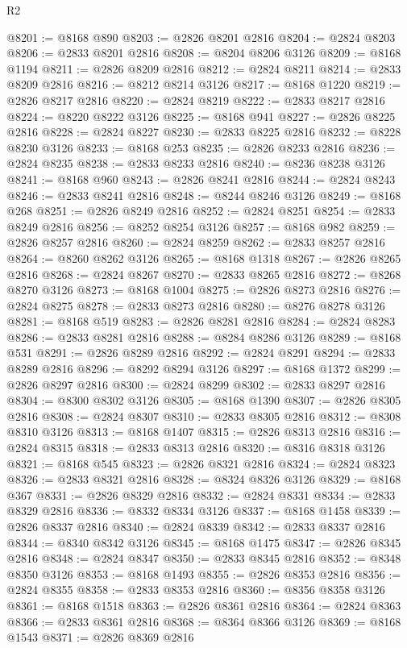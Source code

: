 \begin{lexlean}{R2}
\begin{coremodule}
@8201 := @8168 @890
@8203 := @2826 @8201 @2816
@8204 := @2824 @8203
@8206 := @2833 @8201 @2816
@8208 := @8204 @8206 @3126
@8209 := @8168 @1194
@8211 := @2826 @8209 @2816
@8212 := @2824 @8211
@8214 := @2833 @8209 @2816
@8216 := @8212 @8214 @3126
@8217 := @8168 @1220
@8219 := @2826 @8217 @2816
@8220 := @2824 @8219
@8222 := @2833 @8217 @2816
@8224 := @8220 @8222 @3126
@8225 := @8168 @941
@8227 := @2826 @8225 @2816
@8228 := @2824 @8227
@8230 := @2833 @8225 @2816
@8232 := @8228 @8230 @3126
@8233 := @8168 @253
@8235 := @2826 @8233 @2816
@8236 := @2824 @8235
@8238 := @2833 @8233 @2816
@8240 := @8236 @8238 @3126
@8241 := @8168 @960
@8243 := @2826 @8241 @2816
@8244 := @2824 @8243
@8246 := @2833 @8241 @2816
@8248 := @8244 @8246 @3126
@8249 := @8168 @268
@8251 := @2826 @8249 @2816
@8252 := @2824 @8251
@8254 := @2833 @8249 @2816
@8256 := @8252 @8254 @3126
@8257 := @8168 @982
@8259 := @2826 @8257 @2816
@8260 := @2824 @8259
@8262 := @2833 @8257 @2816
@8264 := @8260 @8262 @3126
@8265 := @8168 @1318
@8267 := @2826 @8265 @2816
@8268 := @2824 @8267
@8270 := @2833 @8265 @2816
@8272 := @8268 @8270 @3126
@8273 := @8168 @1004
@8275 := @2826 @8273 @2816
@8276 := @2824 @8275
@8278 := @2833 @8273 @2816
@8280 := @8276 @8278 @3126
@8281 := @8168 @519
@8283 := @2826 @8281 @2816
@8284 := @2824 @8283
@8286 := @2833 @8281 @2816
@8288 := @8284 @8286 @3126
@8289 := @8168 @531
@8291 := @2826 @8289 @2816
@8292 := @2824 @8291
@8294 := @2833 @8289 @2816
@8296 := @8292 @8294 @3126
@8297 := @8168 @1372
@8299 := @2826 @8297 @2816
@8300 := @2824 @8299
@8302 := @2833 @8297 @2816
@8304 := @8300 @8302 @3126
@8305 := @8168 @1390
@8307 := @2826 @8305 @2816
@8308 := @2824 @8307
@8310 := @2833 @8305 @2816
@8312 := @8308 @8310 @3126
@8313 := @8168 @1407
@8315 := @2826 @8313 @2816
@8316 := @2824 @8315
@8318 := @2833 @8313 @2816
@8320 := @8316 @8318 @3126
@8321 := @8168 @545
@8323 := @2826 @8321 @2816
@8324 := @2824 @8323
@8326 := @2833 @8321 @2816
@8328 := @8324 @8326 @3126
@8329 := @8168 @367
@8331 := @2826 @8329 @2816
@8332 := @2824 @8331
@8334 := @2833 @8329 @2816
@8336 := @8332 @8334 @3126
@8337 := @8168 @1458
@8339 := @2826 @8337 @2816
@8340 := @2824 @8339
@8342 := @2833 @8337 @2816
@8344 := @8340 @8342 @3126
@8345 := @8168 @1475
@8347 := @2826 @8345 @2816
@8348 := @2824 @8347
@8350 := @2833 @8345 @2816
@8352 := @8348 @8350 @3126
@8353 := @8168 @1493
@8355 := @2826 @8353 @2816
@8356 := @2824 @8355
@8358 := @2833 @8353 @2816
@8360 := @8356 @8358 @3126
@8361 := @8168 @1518
@8363 := @2826 @8361 @2816
@8364 := @2824 @8363
@8366 := @2833 @8361 @2816
@8368 := @8364 @8366 @3126
@8369 := @8168 @1543
@8371 := @2826 @8369 @2816

\end{coremodule}
\end{lexlean}
